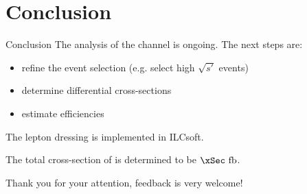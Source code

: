 \documentclass{beamer}
\newcommand{\figurepath}{../analysis/fig/fig_ex}
\newcommand{\tripleFigDistance}{\vspace{-1.2em}}
\begin{document}
\section{Conclusion}

\begin{frame}{Conclusion}
The analysis of the \eeto\qqln channel is ongoing. The next steps are:
\begin{itemize}
\item refine the event selection (e.g. select high $\sqrt{s'}$ events)
\item determine differential cross-sections
\item estimate efficiencies
\end{itemize}


The lepton dressing is implemented in ILCsoft.


The total cross-section of \eeto\qqln is determined to be $\xSec~\fb$.


\vspace{1em}
Thank you for your attention, feedback is very welcome!
\end{frame}




\end{document}
